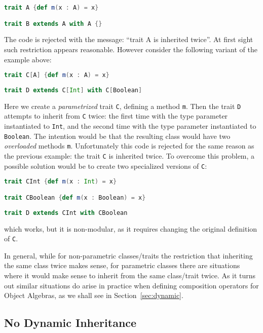 \begin{lstlisting}[language=scala]
trait A {def m(x : A) = x}

trait B extends A with A {}
\end{lstlisting}

\noindent The code is rejected with the message: ``trait A is
inherited twice''. At first sight such restriction appears
reasonable. However consider the following variant of the example 
above:

\begin{lstlisting}[language=scala]
trait C[A] {def m(x : A) = x}
	
trait D extends C[Int] with C[Boolean]
\end{lstlisting}

\noindent Here we create a \emph{parametrized} trait \lstinline{C}, 
defining a method \lstinline{m}. Then the trait \lstinline{D} attempts 
to inherit from \lstinline{C} twice: the first time with the type
parameter instantiated to \lstinline{Int}, and the second time with
the type parameter instantiated to \lstinline{Boolean}. The intention 
would be that the resulting class would have two \emph{overloaded}
methods \lstinline{m}. Unfortunately this code is rejected for the
same reason as the previous example: the trait \lstinline{C} is
inherited twice. To overcome this problem, a possible solution would
be to create two specialized versions of \lstinline{C}:

\begin{lstlisting}[language=scala]
trait CInt {def m(x : Int) = x}

trait CBoolean {def m(x : Boolean) = x}
	
trait D extends CInt with CBoolean
\end{lstlisting}

\noindent which works, but it is non-modular, as it requires changing 
the original definition of \lstinline{C}. 

In general, while for non-parametric classes/traits the restriction
that inheriting the same class twice makes sense, for parametric
classes there are situations where it would make sense to inherit 
from the same class/trait twice. As it turns out similar situations 
do arise in practice when defining composition operators for
Object Algebras, as we shall see in Section~\ref{sec:dynamic}.

\subsection{No Dynamic Inheritance}
\label{sec:scala-merge}

